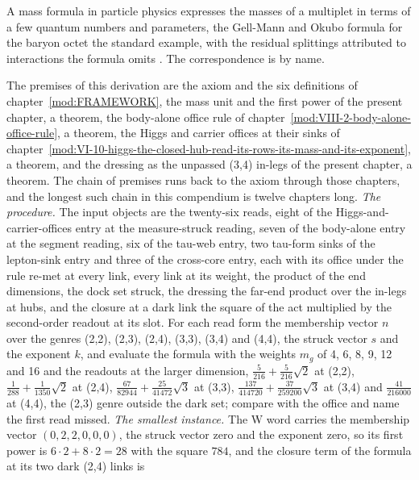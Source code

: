\begin{chbridge}
A mass formula in particle physics expresses the masses of a multiplet in terms of a few quantum numbers and parameters, the Gell-Mann and Okubo formula for the baryon octet the standard example, with the residual splittings attributed to interactions the formula omits \cite{GellMann1962,Okubo1962}. The correspondence is by name.
\end{chbridge}
\begin{chproof}
The premises of this derivation are the axiom and the six definitions of chapter~\ref{mod:FRAMEWORK}, the mass unit and the first power of the present chapter, a theorem, the body-alone office rule of chapter~\ref{mod:VIII-2-body-alone-office-rule}, a theorem, the Higgs and carrier offices at their sinks of chapter~\ref{mod:VI-10-higgs-the-closed-hub-read-its-rows-its-mass-and-its-exponent}, a theorem, and the dressing as the unpassed (3,4) in-legs of the present chapter, a theorem. The chain of premises runs back to the axiom through those chapters, and the longest such chain in this compendium is twelve chapters long.
\textit{The procedure.} The input objects are the twenty-six reads, eight of the Higgs-and-carrier-offices entry at the measure-struck reading, seven of the body-alone entry at the segment reading, six of the tau-web entry, two tau-form sinks of the lepton-sink entry and three of the cross-core entry, each with its office under the rule re-met at every link, every link at its weight, the product of the end dimensions, the dock set struck, the dressing the far-end product over the in-legs at hubs, and the closure at a dark link the square of the act multiplied by the second-order readout at its slot. For each read form the membership vector $n$ over the genres (2,2), (2,3), (2,4), (3,3), (3,4) and (4,4), the struck vector $s$ and the exponent $k$, and evaluate the formula with the weights $m_{g}$ of 4, 6, 8, 9, 12 and 16 and the readouts at the larger dimension, $\tfrac{5}{216} + \tfrac{5}{216}\sqrt{2}$ at (2,2), $\tfrac{1}{288} + \tfrac{1}{1350}\sqrt{2}$ at (2,4), $\tfrac{67}{82944} + \tfrac{25}{41472}\sqrt{3}$ at (3,3), $\tfrac{137}{414720} + \tfrac{37}{259200}\sqrt{3}$ at (3,4) and $\tfrac{41}{216000}$ at (4,4), the (2,3) genre outside the dark set; compare with the office and name the first read missed.
\textit{The smallest instance.} The W word carries the membership vector $(0, 2, 2, 0, 0, 0)$, the struck vector zero and the exponent zero, so its first power is $6\cdot 2 + 8\cdot 2 = 28$ with the square $784$, and the closure term of the formula at its two dark (2,4) links is

\end{chproof}
